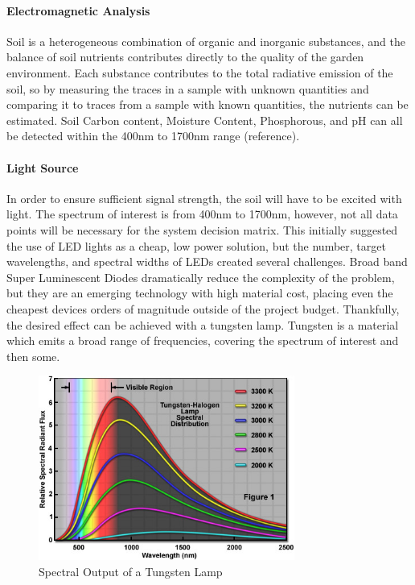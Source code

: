 \paragraph{Electromagnetic Analysis} Soil is a heterogeneous combination of organic and inorganic substances, and the balance of soil nutrients contributes directly to the quality of the garden environment. Each substance contributes to the total radiative emission of the soil, so by measuring the traces in a sample with unknown quantities and comparing it to traces from a sample with known quantities, the nutrients can be estimated. Soil Carbon content, Moisture Content, Phosphorous, and pH can all be detected within the 400nm to 1700nm range (reference).

\paragraph{Light Source} In order to ensure sufficient signal strength, the soil will have to be excited with light. The spectrum of interest is from 400nm to 1700nm, however, not all data points will be necessary for the system decision matrix. This initially suggested the use of LED lights as a cheap, low power solution, but the number, target wavelengths, and spectral widths of LEDs created several challenges. Broad band Super Luminescent Diodes dramatically reduce the complexity of the problem, but they are an emerging technology with high material cost, placing even the cheapest devices orders of magnitude outside of the project budget. Thankfully, the desired effect can be achieved with a tungsten lamp. Tungsten is a material which emits a broad range of frequencies, covering the spectrum of interest and then some.

\begin{figure}[H]
    \caption{Spectral Output of a Tungsten Lamp}
    \centering
    \includegraphics[width=0.75\textwidth]{images/TungstenLamp.jpg}
\end{figure}


